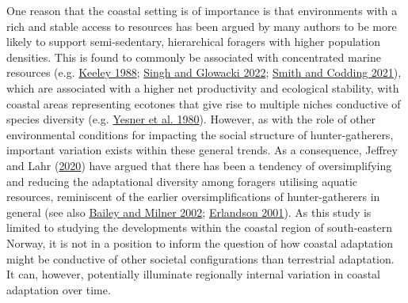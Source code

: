 \documentclass[
  12pt,
  a4paper,
  oneside]{book}
\begin{document}
One reason that the coastal setting is of importance is that environments with a rich and stable access to resources has been argued by many authors to be more likely to support semi-sedentary, hierarchical foragers with higher population densities. This is found to commonly be associated with concentrated marine resources (e.g. \protect\hyperlink{ref-keeley1988}{Keeley 1988}; \protect\hyperlink{ref-singh2022}{Singh and Glowacki 2022}; \protect\hyperlink{ref-smith2021}{Smith and Codding 2021}), which are associated with a higher net productivity and ecological stability, with coastal areas representing ecotones that give rise to multiple niches conductive of species diversity (e.g. \protect\hyperlink{ref-yesner1980}{Yesner et al. 1980}). However, as with the role of other environmental conditions for impacting the social structure of hunter-gatherers, important variation exists within these general trends. As a consequence, Jeffrey and Lahr (\protect\hyperlink{ref-jeffery2020}{2020}) have argued that there has been a tendency of oversimplifying and reducing the adaptational diversity among foragers utilising aquatic resources, reminiscent of the earlier oversimplifications of hunter-gatherers in general (see also \protect\hyperlink{ref-bailey2002}{Bailey and Milner 2002}; \protect\hyperlink{ref-erlandson2001}{Erlandson 2001}). As this study is limited to studying the developments within the coastal region of south-eastern Norway, it is not in a position to inform the question of how coastal adaptation might be conductive of other societal configurations than terrestrial adaptation. It can, however, potentially illuminate regionally internal variation in coastal adaptation over time.
\end{document}
